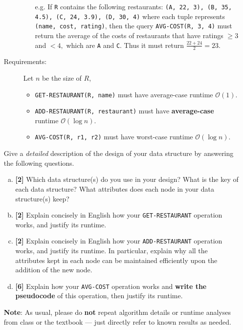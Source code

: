 \documentclass{assignment-263}
\begin{document}
\begin{enumerate}
\begin{description}
\begin{itemize}
      e.g. If \texttt{R} contains the following restaurants:
      \texttt{(A, 22, 3), (B, 35, 4.5), (C, 24, 3.9), (D, 30, 4)}
      where each tuple represents \texttt{(name, cost, rating)}, then
      the query \texttt{AVG-COST(R, 3, 4)} must return the average of
      the costs of restaurants that have ratings $\ge 3$ and $< 4,$
      which are \texttt{A} and \texttt{C}. Thus it must return
      $\frac{22 + 24}{2} = 23.$
    \end{itemize}
  \item[Requirements:] Let $n$ be the size of $R$,
    \begin{itemize}
    \item \texttt{GET-RESTAURANT(R, name)} must have average-case runtime
      $\mathcal{O}(1)$.
    \item \texttt{ADD-RESTAURANT(R, restaurant)} must have
      \textbf{\color{red} average-case} runtime $\mathcal{O}(\log n)$.
    \item \texttt{AVG-COST(R, r1, r2)} must have worst-case runtime
      $\mathcal{O}(\log n)$.
    \end{itemize}
  \end{description}

  Give a \emph{detailed} description of the design of your data
  structure by answering the following questions.

  \begin{enumerate}[(a)]
  \item \textbf{[2]} Which data structure(s) do you use in your design? What is the
    key of each data structure? What attributes does each node in your
    data structure(s) keep?

  \item \textbf{[2]} Explain concisely in English how your \texttt{GET-RESTAURANT}
    operation works, and justify its runtime.

  \item \textbf{[2]} Explain concisely in English how your \texttt{ADD-RESTAURANT}
    operation works, and justify its runtime. In particular, explain
    why all the attributes kept in each node can be maintained
    efficiently upon the addition of the new node.

  \item \textbf{[6]} Explain how your \texttt{AVG-COST} operation works and
    \textbf{write the pseudocode} of this operation, then justify its
    runtime.
  \end{enumerate}

  \textbf{Note}: As usual, please do \textbf{not} repeat algorithm
  details or runtime analyses from class or the textbook --- just
  directly refer to known results as needed.



\end{enumerate}
\end{document}
